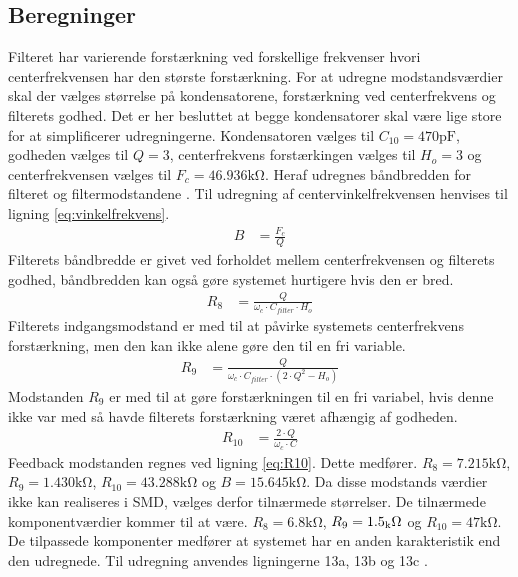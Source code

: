 \subsection{Beregninger}
Filteret har varierende forstærkning ved forskellige frekvenser hvori centerfrekvensen har den største forstærkning. For at udregne modstandsværdier skal der vælges størrelse på kondensatorene, forstærkning ved centerfrekvens og filterets godhed.
Det er her besluttet at begge kondensatorer skal være lige store for at simplificerer udregningerne.
Kondensatoren vælges til $C_{10} = 470 \si{\pico\farad}$, godheden vælges til $Q = 3$, centerfrekvens forstærkingen vælges til $H_o = 3$ og centerfrekvensen vælges til $F_c = 46.936 \si{\kilo\ohm}$.
Heraf udregnes båndbredden for filteret og filtermodstandene \cite[Side. 209]{Huelsman1993}.
Til udregning af centervinkelfrekvensen henvises til ligning \ref{eq:vinkelfrekvens}.
\begin{align}
	B & = \frac{F_c}{Q}
	\end{align}
Filterets båndbredde er givet ved forholdet mellem centerfrekvensen og filterets godhed, båndbredden kan også gøre systemet hurtigere hvis den er bred.
\begin{align}
	R_8 & = \frac{Q}{\omega_c \cdot C_{filter} \cdot H_o } \label{eq:R8}
	\end{align}
Filterets indgangsmodstand er med til at påvirke systemets centerfrekvens forstærkning, men den kan ikke alene gøre den til en fri variable. 
\begin{align}
	R_9 & = \frac{Q}{ \omega_c \cdot C_{filter} \cdot \left( 2 \cdot Q^2 - H_o \right) } \label{eq:R9}
	\end{align}
Modstanden $R_9$ er med til at gøre forstærkningen til en fri variabel, hvis denne ikke var med så havde filterets forstærkning været afhængig af godheden.
\begin{align}
	R_{10} & = \frac{2 \cdot Q}{ \omega_c \cdot C} \label{eq:R10}
\end{align}
Feedback modstanden regnes ved ligning \ref{eq:R10}.
Dette medfører. $R_8 = 7.215 \si{\kilo\ohm}$, $R_9 = 1.430 \si{\kilo\ohm}$, $R_{10} = 43.288 \si{\kilo\ohm}$ og $B = 15.645 \si{\kilo\ohm}$.
Da disse modstands værdier ikke kan realiseres i SMD, vælges derfor tilnærmede størrelser.
De tilnærmede komponentværdier kommer til at være. $R_8 = 6.8 \si{\kilo\ohm}$, $R_9 = 1.5 \si{_\kilo\ohm}$ og $R_{10} = 47 \si{\kilo\ohm}$.
De tilpassede komponenter medfører at systemet har en anden karakteristik end den udregnede. 
Til udregning anvendes ligningerne 13a, 13b og 13c \cite[Side. 208]{Huelsman1993}. 
